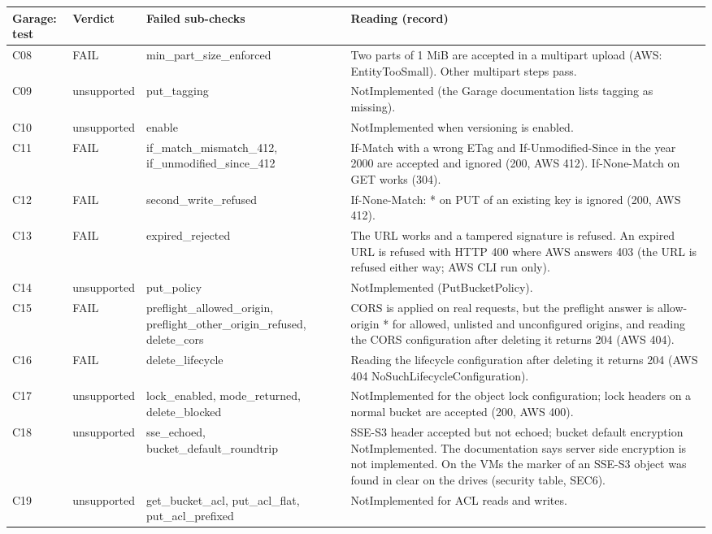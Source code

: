 \begin{tabular}{@{}lp{2.0cm}p{3.6cm}p{7.0cm}@{}}
\toprule
Garage: test & Verdict & Failed sub-checks & Reading (record) \\
\midrule
C08 & FAIL & min\_part\_size\_enforced & Two parts of 1 MiB are accepted in a multipart upload (AWS: EntityTooSmall). Other multipart steps pass. \\
C09 & unsupported & put\_tagging & NotImplemented (the Garage documentation lists tagging as missing). \\
C10 & unsupported & enable & NotImplemented when versioning is enabled. \\
C11 & FAIL & if\_match\_mismatch\_412, if\_unmodified\_since\_412 & If-Match with a wrong ETag and If-Unmodified-Since in the year 2000 are accepted and ignored (200, AWS 412). If-None-Match on GET works (304). \\
C12 & FAIL & second\_write\_refused & If-None-Match: * on PUT of an existing key is ignored (200, AWS 412). \\
C13 & FAIL & expired\_rejected & The URL works and a tampered signature is refused. An expired URL is refused with HTTP 400 where AWS answers 403 (the URL is refused either way; AWS CLI run only). \\
C14 & unsupported & put\_policy & NotImplemented (PutBucketPolicy). \\
C15 & FAIL & preflight\_allowed\_origin, preflight\_other\_origin\_refused, delete\_cors & CORS is applied on real requests, but the preflight answer is allow-origin * for allowed, unlisted and unconfigured origins, and reading the CORS configuration after deleting it returns 204 (AWS 404). \\
C16 & FAIL & delete\_lifecycle & Reading the lifecycle configuration after deleting it returns 204 (AWS 404 NoSuchLifecycleConfiguration). \\
C17 & unsupported & lock\_enabled, mode\_returned, delete\_blocked & NotImplemented for the object lock configuration; lock headers on a normal bucket are accepted (200, AWS 400). \\
C18 & unsupported & sse\_echoed, bucket\_default\_roundtrip & SSE-S3 header accepted but not echoed; bucket default encryption NotImplemented. The documentation says server side encryption is not implemented. On the VMs the marker of an SSE-S3 object was found in clear on the drives (security table, SEC6). \\
C19 & unsupported & get\_bucket\_acl, put\_acl\_flat, put\_acl\_prefixed & NotImplemented for ACL reads and writes. \\

\end{tabular}
